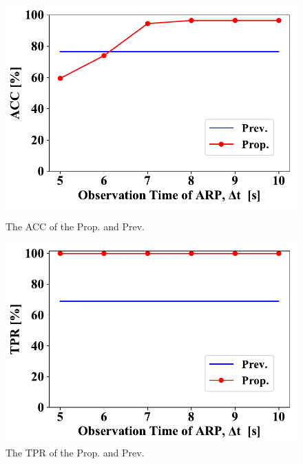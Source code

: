 \documentclass[conference]{IEEEtran}
\begin{document}
\begin{figure}[ht]
    \begin{minipage}{0.33\hsize}
        \begin{center}
            \includegraphics[scale=0.4]{figure/ACC.pdf}
        \end{center}
        \caption{The ACC of the Prop. and Prev.}
        \label{fig:acc}
    \end{minipage}
    \begin{minipage}{0.33\hsize}
        \begin{center}
            \includegraphics[scale=0.4]{figure/TPR.pdf}
        \end{center}
        \caption{The TPR of the Prop. and Prev.}
        \label{fig:tpr}
    \end{minipage}
    \begin{minipage}{0.33\hsize}

\end{minipage}
\end{figure}
\end{document}
